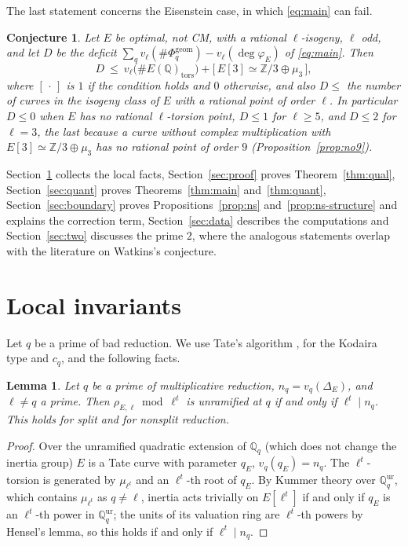 \documentclass[11pt]{amsart}
\newtheorem{conjecture}[theorem]{Conjecture}
\newtheorem{lemma}[theorem]{Lemma}
\theoremstyle{definition}
\newcommand{\Q}{\mathbb{Q}}
\newcommand{\Z}{\mathbb{Z}}
\newcommand{\degphi}{\deg\varphi_E}
\newcommand{\Phig}{\Phi^{\mathrm{geom}}}
\begin{document}
The last statement concerns the Eisenstein case, in which \eqref{eq:main} can fail.

\begin{conjecture}\label{conj:eis}
Let $E$ be optimal, not CM, with a rational $\ell$-isogeny, $\ell$ odd, and let $D$ be the deficit $\sum_q v_\ell(\#\Phig_q)-v_\ell(\degphi)$ of \eqref{eq:main}. Then
\[
D\ \le\ v_\ell\bigl(\#E(\Q)_{\mathrm{tors}}\bigr)+\bigl[\,E[3]\simeq\Z/3\oplus\mu_3\,\bigr],
\]
where $[\,\cdot\,]$ is $1$ if the condition holds and $0$ otherwise, and also $D\le$ the number of curves in the isogeny class of $E$ with a rational point of order $\ell$. In particular $D\le0$ when $E$ has no rational $\ell$-torsion point, $D\le1$ for $\ell\ge5$, and $D\le2$ for $\ell=3$, the last because a curve without complex multiplication with $E[3]\simeq\Z/3\oplus\mu_3$ has no rational point of order $9$ (Proposition~\ref{prop:no9}).
\end{conjecture}

Section~\ref{sec:local} collects the local facts, Section~\ref{sec:proof} proves Theorem~\ref{thm:qual}, Section~\ref{sec:quant} proves Theorems~\ref{thm:main} and~\ref{thm:quant}, Section~\ref{sec:boundary} proves Propositions~\ref{prop:ns} and~\ref{prop:ns-structure} and explains the correction term, Section~\ref{sec:data} describes the computations and Section~\ref{sec:two} discusses the prime $2$, where the analogous statements overlap with the literature on Watkins's conjecture.

\section{Local invariants}\label{sec:local}

Let $q$ be a prime of bad reduction. We use Tate's algorithm \cite{Tate75}, \cite[IV.9]{SilvermanATAEC} for the Kodaira type and $c_q$, and the following facts.

\begin{lemma}\label{lem:tamagawa-exp}
Let $q$ be a prime of multiplicative reduction, $n_q=v_q(\Delta_E)$, and $\ell\ne q$ a prime. Then $\rho_{E,\ell}\bmod\ell^t$ is unramified at $q$ if and only if $\ell^t\mid n_q$. This holds for split and for nonsplit reduction.
\end{lemma}

\begin{proof}
Over the unramified quadratic extension of $\Q_q$ (which does not change the inertia group) $E$ is a Tate curve with parameter $q_E$, $v_q(q_E)=n_q$. The $\ell^t$-torsion is generated by $\mu_{\ell^t}$ and an $\ell^t$-th root of $q_E$. By Kummer theory over $\Q_q^{\mathrm{ur}}$, which contains $\mu_{\ell^t}$ as $q\ne\ell$, inertia acts trivially on $E[\ell^t]$ if and only if $q_E$ is an $\ell^t$-th power in $\Q_q^{\mathrm{ur}}$; the units of its valuation ring are $\ell^t$-th powers by Hensel's lemma, so this holds if and only if $\ell^t\mid n_q$.
\end{proof}
\end{document}
